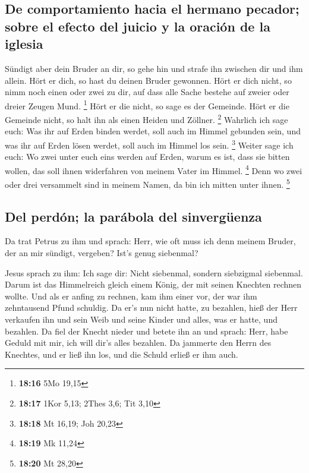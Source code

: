 \hypertarget{de-comportamiento-hacia-el-hermano-pecador-sobre-el-efecto-del-juicio-y-la-oraciuxf3n-de-la-iglesia}{%
\subsection{De comportamiento hacia el hermano pecador; sobre el efecto
del juicio y la oración de la
iglesia}\label{de-comportamiento-hacia-el-hermano-pecador-sobre-el-efecto-del-juicio-y-la-oraciuxf3n-de-la-iglesia}}

 Sündigt aber dein Bruder an dir, so gehe hin und strafe
ihn zwischen dir und ihm allein. Hört er dich, so hast du deinen Bruder
gewonnen.  Hört er dich nicht, so nimm noch einen oder
zwei zu dir, auf dass alle Sache bestehe auf zweier oder dreier Zeugen
Mund. \footnote{\textbf{18:16} 5Mo 19,15}  Hört er die
nicht, so sage es der Gemeinde. Hört er die Gemeinde nicht, so halt ihn
als einen Heiden und Zöllner. \footnote{\textbf{18:17} 1Kor 5,13; 2Thes
  3,6; Tit 3,10}  Wahrlich ich sage euch: Was ihr auf
Erden binden werdet, soll auch im Himmel gebunden sein, und was ihr auf
Erden lösen werdet, soll auch im Himmel los sein. \footnote{\textbf{18:18}
  Mt 16,19; Joh 20,23}  Weiter sage ich euch: Wo zwei
unter euch eins werden auf Erden, warum es ist, dass sie bitten wollen,
das soll ihnen widerfahren von meinem Vater im Himmel. \footnote{\textbf{18:19}
  Mk 11,24}  Denn wo zwei oder drei versammelt sind in
meinem Namen, da bin ich mitten unter ihnen. \footnote{\textbf{18:20} Mt
  28,20}

\hypertarget{del-perduxf3n-la-paruxe1bola-del-sinverguxfcenza}{%
\subsection{Del perdón; la parábola del
sinvergüenza}\label{del-perduxf3n-la-paruxe1bola-del-sinverguxfcenza}}

 Da trat Petrus zu ihm und sprach: Herr, wie oft muss ich
denn meinem Bruder, der an mir sündigt, vergeben? Ist's genug siebenmal?

 Jesus sprach zu ihm: Ich sage dir: Nicht siebenmal,
sondern siebzigmal siebenmal.  Darum ist das Himmelreich
gleich einem König, der mit seinen Knechten rechnen wollte.
 Und als er anfing zu rechnen, kam ihm einer vor, der war
ihm zehntausend Pfund schuldig.  Da er's nun nicht hatte,
zu bezahlen, hieß der Herr verkaufen ihn und sein Weib und seine Kinder
und alles, was er hatte, und bezahlen.  Da fiel der
Knecht nieder und betete ihn an und sprach: Herr, habe Geduld mit mir,
ich will dir's alles bezahlen.  Da jammerte den Herrn des
Knechtes, und er ließ ihn los, und die Schuld erließ er ihm auch.

